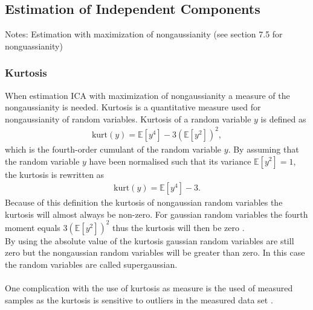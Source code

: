 \subsection{Estimation of Independent Components}
Notes:
Estimation with maximization of nongaussianity (see section 7.5 for nonguassianity)


\subsubsection{Kurtosis}
When estimation ICA with maximization of nongaussianity a measure of the nongaussianity is needed. Kurtosis is a quantitative measure used for nongaussianity of random variables. Kurtosis of a random variable $y$ is defined as
\begin{align*}
\text{kurt} (y) = \mathbb{E}[y^4] - 3 ( \mathbb{E}[y^2])^2,
\end{align*}
which is the fourth-order cumulant of the random variable $y$. By assuming that the random variable $y$ have been normalised such that its variance $\mathbb{E}[y^2] = 1$, the kurtosis is rewritten as
\begin{align*}
\text{kurt} (y) = \mathbb{E}[y^4] - 3.
\end{align*}
Because of this definition the kurtosis of nongaussian random variables the kurtosis will almost always be non-zero. For gaussian random variables the fourth moment equals $3(\mathbb{E}[y^2])^2$ thus the kurtosis will then be zero \cite[p. 171]{ICA}.
\\
By using the absolute value of the kurtosis gaussian random variables are still zero but the nongaussian random variables will be greater than zero. In this case the random variables are called supergaussian.
\\ \\
One complication with the use of kurtosis as measure is the used of measured samples as the kurtosis is sensitive to outliers in the measured data set \cite[p. 182]{ICA}. 
